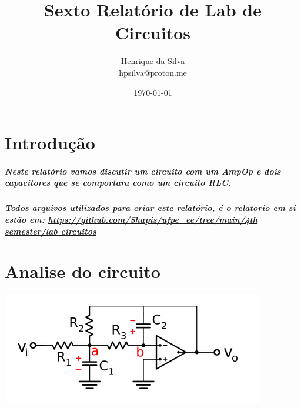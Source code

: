 \documentclass[12pt,twoside, a4paper, twocolumn]{article}
\title{Sexto Relatório de Lab de Circuitos}
\author{Henrique da Silva \\ hpsilva@proton.me}
\date{\today}
\begin{document}
\maketitle
{}
\newpage
\tableofcontents
\newpage



\section{Introdução}

\subparagraph*{Neste relatório vamos discutir um circuito com um AmpOp e dois capacitores que se comportara como um circuito RLC.}

\subparagraph*{Todos arquivos utilizados para criar este relatório, é o relatorio em si estão em:  \url{https://github.com/Shapis/ufpe_ee/tree/main/4th semester/lab circuitos}}


\section{Analise do circuito}

\begin{adjustbox}{scale=0.6}
    \includegraphics{Figure_2.png}
\end{adjustbox}
\end{document}
